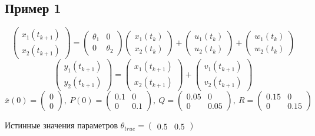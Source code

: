 \documentclass[a4paper,14pt]{extarticle}
\newcommand{\fut}[0]{t_{k+1}}
\begin{document}
\subsection{Пример 1}
\[
  \begin{pmatrix} x_1(\fut) \\ x_2(\fut) \end{pmatrix} =
  \begin{pmatrix} \theta_1 & 0 \\ 0 & \theta_2 \end{pmatrix}
  \begin{pmatrix} x_1(t_k) \\ x_2(t_k) \end{pmatrix}
  + \begin{pmatrix} u_1(t_k) \\ u_2(t_k) \end{pmatrix}
  + \begin{pmatrix} w_1(t_k) \\ w_2(t_k) \end{pmatrix}
\]
\[
  \begin{pmatrix} y_1(\fut) \\ y_2(\fut) \end{pmatrix} =
  \begin{pmatrix} x_1(\fut) \\ x_2(\fut) \end{pmatrix} +
  \begin{pmatrix} v_1(\fut) \\ v_2(\fut) \end{pmatrix}
\]
\[
  \overline{x}(0) = \begin{pmatrix} 0 \\ 0 \end{pmatrix},\
  P(0) = \begin{pmatrix} 0.1 & 0 \\ 0 & 0.1 \end{pmatrix},\
  Q = \begin{pmatrix} 0.05 & 0 \\ 0 & 0.05 \end{pmatrix},\
  R = \begin{pmatrix} 0.15 & 0 \\ 0 & 0.15 \end{pmatrix}
\]

Истинные значения параметров
$\theta_{true} = \begin{pmatrix} 0.5 & 0.5 \end{pmatrix}$ \\
\end{document}

